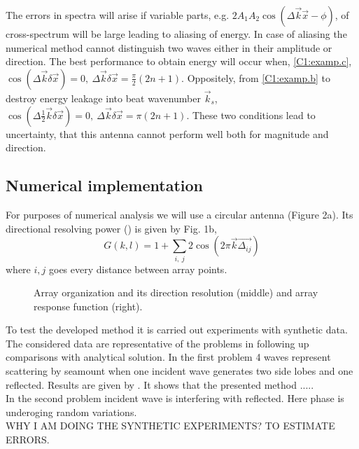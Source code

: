 The errors in spectra will arise if variable parts, e.g. $2A_1A_2 \cos(\Delta \vec{k} \vec{x} - \phi)$,  of cross-spectrum will be large leading to aliasing of energy. In case of aliasing the numerical method cannot distinguish two waves either in their amplitude or direction. The best performance to obtain energy will occur when, \eqref{C1:examp.c}, $\cos (\Delta \vec{k} \delta \vec{x}) = 0,~\Delta \vec{k} \delta \vec{x} = \frac{\pi}{2} (2n + 1)$. Oppositely, from \eqref{C1:examp.b} to destroy energy leakage into beat wavenumber $\vec{k}_s$, $\cos (\Delta \frac{1}{2}\vec{k} \delta \vec{x}) = 0,~\Delta \vec{k} \delta \vec{x} = \pi(2n + 1)$. These two conditions lead to uncertainty, that this antenna cannot perform well both for magnitude and direction. 

\subsection{Numerical implementation}
For purposes of numerical analysis we will use a circular antenna (Figure 2a). Its directional resolving power (\cite{barber1963directional}) is given by Fig. 1b,
\begin{equation}
G(k,l) = 1 + \sum_{i,~j} 2\cos(2\pi \vec{k} \vec{\Delta_{ij}})
\end{equation}
where $i,j$ goes every distance between array points.\\
\begin{figure}
\caption{Array organization and its direction resolution (middle) and array response function (right).}
\end{figure}
To test the developed method it is carried out experiments with synthetic data. The considered data are representative of the problems in following up comparisons with analytical solution. In the first problem 4 waves represent scattering by seamount when one incident wave generates two side lobes and one reflected. Results are given by . It shows that the presented method .....\\
In the second problem incident wave is interfering with reflected. Here phase is underoging random variations.\\
WHY I AM DOING THE SYNTHETIC EXPERIMENTS? TO ESTIMATE ERRORS.\\

